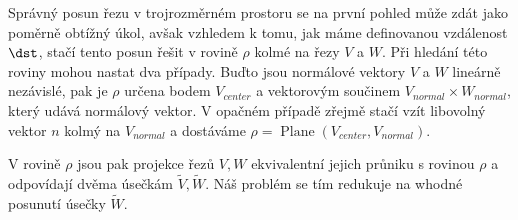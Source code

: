 Správný posun řezu v trojrozměrném prostoru se na první pohled může zdát jako
poměrně obtížný úkol, avšak vzhledem k tomu, jak máme definovanou vzdálenost $ \dst $,
stačí tento posun řešit v rovině $ \rho $ kolmé na řezy $ V $ a $ W $. Při hledání této
roviny mohou nastat dva případy. Buďto jsou normálové vektory $ V $ a $ W $ lineárně
nezávislé, pak je $ \rho $ určena bodem $ V_{center} $ a vektorovým součinem
$ V_{normal} \times W_{normal} $, který udává normálový vektor. V opačném případě
zřejmě stačí vzít libovolný vektor $ n $ kolmý na $ V_{normal} $ a dostáváme
$ \rho = \operatorname{Plane}(V_{center}, V_{normal}) $.

V rovině $ \rho $ jsou pak projekce řezů $ V, W $ ekvivalentní jejich průniku
s rovinou $ \rho $ a odpovídají dvěma úsečkám $ \widetilde{V}, \widetilde{W} $.
Náš problém se tím redukuje na whodné posunutí úsečky $ \widetilde{W} $.
